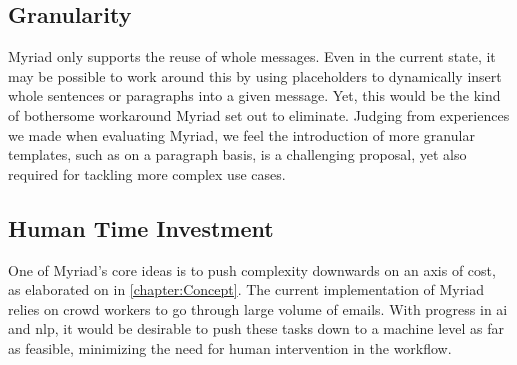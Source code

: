 
\subsection{Granularity}

Myriad only supports the reuse of whole messages. Even in the current state, it may be possible to work around this by using placeholders to dynamically insert whole sentences or paragraphs into a given message. Yet, this would be the kind of bothersome workaround Myriad set out to eliminate. Judging from experiences we made when evaluating Myriad, we feel the introduction of more granular templates, such as on a paragraph basis, is a challenging proposal, yet also required for tackling more complex use cases.

\subsection{Human Time Investment}

One of Myriad’s core ideas is to push complexity downwards on an axis of cost, as elaborated on in \autoref{chapter:Concept}. The current implementation of Myriad relies on crowd workers to go through large volume of emails. With progress in \gls{ai} and \gls{nlp}, it would be desirable to push these tasks down to a machine level as far as feasible, minimizing the need for human intervention in the workflow.


